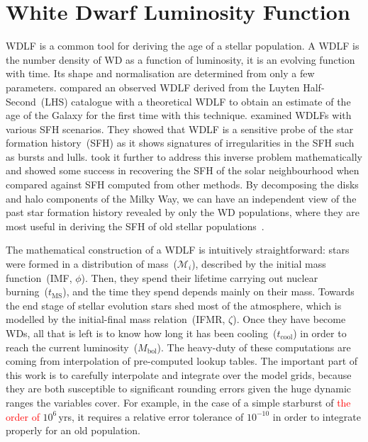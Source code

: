 \documentclass[fleqn,usenatbib]{rasti}
\begin{document}
\section{White Dwarf Luminosity Function}
WDLF is a common tool for deriving the age of a stellar population. A WDLF is
the number density of WD as a function of luminosity, it is an evolving
function with time. Its shape and normalisation are determined from only a few
parameters. \citet{1987ApJ...315L..77W} compared an observed WDLF derived from
the Luyten Half-Second~(LHS) catalogue with a theoretical WDLF to obtain an
estimate of the age of the Galaxy for the first time with this technique.
\citet{1990ApJ...352..605N} examined WDLFs with various SFH scenarios. They
showed that WDLF is a sensitive probe of the star formation history~(SFH) as
it shows signatures of irregularities in the SFH such as bursts and lulls.
\citet{2013MNRAS.434.1549R} took it further to address this inverse problem
mathematically and showed some success in recovering the SFH of the solar
neighbourhood when compared against SFH computed from other methods. By
decomposing the disks and halo components of the Milky Way, we can have an
independent view of the past star formation history revealed by only the
WD populations, where they are most useful in deriving the SFH of old
stellar populations~\citep{2011MNRAS.417...93R, 2017ASPC..509...25L}.

The mathematical construction of a WDLF is intuitively straightforward: stars
were formed in a distribution of mass~($\mathcal{M}_i$), described by the initial
mass function~(IMF, $\phi$). Then, they spend their lifetime carrying out
nuclear burning~($t_{\mathrm{MS}}$), and the time they spend depends mainly on
their mass. Towards the end stage of stellar evolution stars shed most of the
atmosphere, which is modelled by the initial-final mass relation~(IFMR,
$\zeta$). Once they have become WDs, all that is left is to know how long it has
been cooling~($t_{\mathrm{cool}}$) in order to reach the current
luminosity~($M_\mathrm{bol}$). The heavy-duty of these computations
are coming from interpolation of pre-computed lookup tables. The important
part of this work is to carefully interpolate and integrate over the model
grids, because they are both susceptible to significant rounding errors given
the huge dynamic ranges the variables cover. For example, in the case of a simple
starburst of \textcolor{red}{the order of }$10^6$\,yrs, it requires a relative error
tolerance of $10^{-10}$ in order to integrate properly for an old population.
\end{document}
